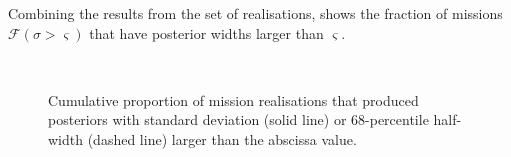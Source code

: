 Combining the results from the set of realisations,  shows the fraction of missions $\mathcal{F}(\sigma > \varsigma)$ that have posterior widths larger than $\varsigma$.
\begin{figure}%
\centering
    \quad 
    \\
    \quad
\caption{Cumulative proportion of mission realisations that produced posteriors with standard deviation (solid line) or $68$-percentile half-width (dashed line) larger than the abscissa value.}\label{fig:Widths}
\end{figure}
